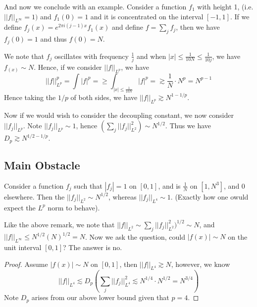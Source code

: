 And now we conclude with an example. Consider a function $f_1$ with height 1, (i.e. $||f||_{L^\infty}=1)$ and $f_1(0)=1$ and it is concentrated on the interval $[-1,1]$. If we define $f_j(x)=e^{2\pi i(j-1)x}f_1(x)$ and define $f=\sum_jf_j$, then we have $f_j(0)=1$ and thus $f(0)=N$.

We note that $f_j$ oscillates with frequency $\frac{1}{j}$ and when $|x|\leq\frac{1}{10N}\leq\frac{1}{10j}$, we have $f_(x)\sim N$. Hence, if we consider $||f||_{L^p}$, we have
\begin{equation*}
    ||f||_{L^p}^p=\int|f|^p=
    \geq\int_{|x|\leq\frac{1}{10N}}|f|^p=
    \gtrsim\frac{1}{N}\cdot N^p=N^{p-1}
\end{equation*}
Hence taking the $1/p$ of both sides, we have $||f||_{L^p}\gtrsim N^{1-1/p}$.

Now if we would wish to consider the decoupling constant, we now consider $||f_j||_{L^p}$. Note $||f_j||_{L^p}\sim 1$, hence $\left(\sum_j||f_j||_{L^2}^2 \right)\sim N^{1/2}$. Thus we have $D_p\gtrsim N^{1/2-1/p}$.

\subsection*{Main Obstacle}
Consider a function $f_j$ such that $|f_j|=1$ on $[0,1]$, and is $\frac{1}{N}$ on $[1, N^3]$, and 0 elsewhere. Then the $||f_j||_{L^2}\sim N^{1/2}$, whereas $||f_j||_{L^4}\sim 1$. (Exactly how one owuld expect the $L^p$ norm to behave).

Like the above remark, we note that $||f||_{L^2}\sim \sum_j||f_j||_{L^2}^2)^{1/2}\sim N$, and $||f||_{L^\infty}\leq N^{1/2}(N)^{1/2}=N$. Now we ask the question, could $|f(x)|\sim N$ on the unit interval $[0,1]$?
The answer is no.
\begin{proof}
    Assume $|f(x)|\sim N$ on $[0,1]$, then $||f||_{L^4}\gtrsim N$, however, we know
    \begin{equation*}
        ||f||_{L^4}\lesssim D_p\left(\sum_j||f_j||_{L^4}^2\lesssim N^{1/4}\cdot N^{1/2}=N^{3/4} \right)
    \end{equation*}
    Note $D_p$ arises from our above lower bound given that $p=4$.
\end{proof}

